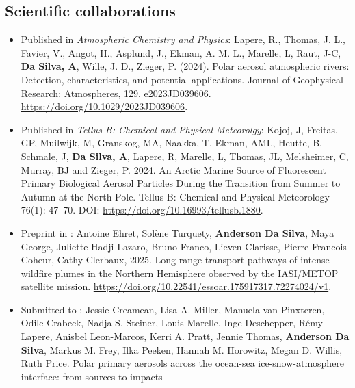     \subsection*{Scientific collaborations}
    \begin{itemize}
        \item Published in \textit{Atmospheric Chemistry and Physics}:
        Lapere, R., Thomas, J. L., Favier, V., Angot, H., Asplund, J., Ekman, A. M. L., Marelle, L, Raut, J-C, \textbf{Da Silva, A}, Wille, J. D., Zieger, P. (2024). Polar aerosol atmospheric rivers: Detection, characteristics, and potential applications. Journal of  Geophysical Research: Atmospheres, 129, e2023JD039606. \url{https://doi.org/10.1029/2023JD039606}.

        \item Published in \textit{Tellus B: Chemical and Physical Meteorolgy}:
        Kojoj, J, Freitas, GP, Muilwijk, M, Granskog, MA, Naakka, T, Ekman, AML, Heutte, B, Schmale, J, \textbf{Da Silva, A}, Lapere, R, Marelle, L, Thomas, JL, Melsheimer, C, Murray, BJ and Zieger, P. 2024. An Arctic Marine Source of Fluorescent Primary Biological Aerosol Particles During the Transition from Summer to Autumn at the North Pole. Tellus B: Chemical and Physical Meteorology  76(1): 47–70. DOI: \url{https://doi.org/10.16993/tellusb.1880}.

        \item Preprint in :
        Antoine Ehret, Solène Turquety, \textbf{Anderson Da Silva}, Maya George, Juliette Hadji-Lazaro, Bruno Franco, Lieven Clarisse, Pierre-Francois Coheur, Cathy Clerbaux, 2025. Long-range transport pathways of intense wildfire plumes in the Northern Hemisphere observed by the IASI/METOP satellite mission. \url{https://doi.org/10.22541/essoar.175917317.72274024/v1}.


    \item Submitted to :
        Jessie Creamean, Lisa A. Miller, Manuela van Pinxteren, Odile Crabeck, Nadja S. Steiner, Louis Marelle, Inge Deschepper, Rémy Lapere, Anisbel Leon-Marcos, Kerri A. Pratt, Jennie Thomas, \textbf{Anderson Da Silva}, Markus M. Frey, Ilka Peeken, Hannah M. Horowitz, Megan D. Willis, Ruth Price. Polar primary aerosols across the ocean-sea ice-snow-atmosphere interface: from sources to impacts


    \end{itemize}

